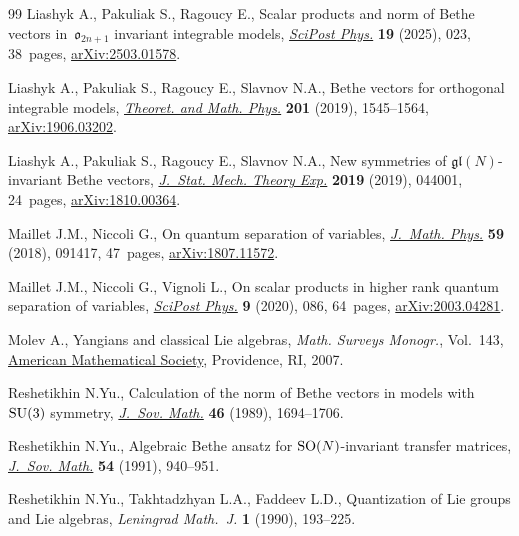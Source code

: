 \documentclass[pdftex]{sigma}
\theoremstyle{definition}
\begin{document}
\begin{thebibliography}{99}
Liashyk A., Pakuliak S., Ragoucy E., Scalar products and norm of {B}ethe
 vectors in~{$\mathfrak{o}_{2n+1}$} invariant integrable models,
 \href{https://doi.org/10.21468/SciPostPhys.19.1.023}{\textit{SciPost Phys.}}
 \textbf{19} (2025), 023, 38~pages,
 \href{http://arxiv.org/abs/2503.01578}{arXiv:2503.01578}.

Liashyk A., Pakuliak S., Ragoucy E., Slavnov N.A., Bethe vectors for orthogonal
 integrable models,
 \href{https://doi.org/10.1134/S0040577919110023}{\textit{Theoret. and Math.
 Phys.}} \textbf{201} (2019), 1545--1564,
 \href{http://arxiv.org/abs/1906.03202}{arXiv:1906.03202}.

Liashyk A., Pakuliak S., Ragoucy E., Slavnov N.A., New symmetries of
 {$\mathfrak{gl}(N)$}-invariant {B}ethe vectors,
 \href{https://doi.org/10.1088/1742-5468/ab02f0}{\textit{J.~Stat. Mech. Theory
 Exp.}} \textbf{2019} (2019), 044001, 24~pages,
 \href{http://arxiv.org/abs/1810.00364}{arXiv:1810.00364}.

Maillet J.M., Niccoli G., On quantum separation of variables,
 \href{https://doi.org/10.1063/1.5050989}{\textit{J.~Math. Phys.}} \textbf{59}
 (2018), 091417, 47~pages,
 \href{http://arxiv.org/abs/1807.11572}{arXiv:1807.11572}.

Maillet J.M., Niccoli G., Vignoli L., On scalar products in higher rank quantum
 separation of variables,
 \href{https://doi.org/10.21468/SciPostPhys.9.6.086}{\textit{SciPost Phys.}}
 \textbf{9} (2020), 086, 64~pages,
 \href{http://arxiv.org/abs/2003.04281}{arXiv:2003.04281}.

Molev A., Yangians and classical {L}ie algebras, \textit{Math. Surveys
 Monogr.}, Vol.~143, \href{https://doi.org/10.1090/surv/143}{American
 Mathematical Society}, Providence, RI, 2007.

Reshetikhin N.Yu., Calculation of the norm of {B}ethe vectors in models
 with~{${\rm SU}(3)$} symmetry,
 \href{https://doi.org/10.1007/BF01099200}{\textit{J.~Sov. Math.}} \textbf{46}
 (1989), 1694--1706.

Reshetikhin N.Yu., Algebraic {B}ethe ansatz for {${\rm SO}(N)$}-invariant
 transfer matrices, \href{https://doi.org/10.1007/BF01101125}{\textit{J.~Sov.
 Math.}} \textbf{54} (1991), 940--951.

Reshetikhin N.Yu., Takhtadzhyan L.A., Faddeev L.D., Quantization of {L}ie groups
 and {L}ie algebras, \textit{Leningrad Math.~J.} \textbf{1} (1990), 193--225.


\end{thebibliography}
\end{document}
